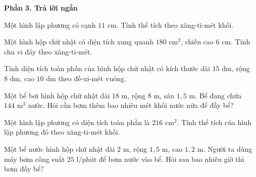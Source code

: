 \textbf{Phần 3. Trả lời ngắn}

\begin{ex} %
Một hình lập phương có cạnh $11\text{ cm}$. Tính thể tích theo xăng-ti-mét khối.
\end{ex}

\begin{ex} %
Một hình hộp chữ nhật có diện tích xung quanh $180\text{ cm}^2$, chiều cao $6\text{ cm}$. Tính chu vi đáy theo xăng-ti-mét.
\end{ex}

\begin{ex} %
Tính diện tích toàn phần của hình hộp chữ nhật có kích thước dài $15\text{ dm}$, rộng $8\text{ dm}$, cao $10\text{ dm}$ theo đề-xi-mét vuông.
\end{ex}

\begin{ex} %
Một bể bơi hình hộp chữ nhật dài $18\text{ m}$, rộng $8\text{ m}$, sâu $1{,}5\text{ m}$. Bể đang chứa $144\text{ m}^3$ nước. Hỏi cần bơm thêm bao nhiêu mét khối nước nữa để đầy bể?
\end{ex}

\begin{ex} %
Một hình lập phương có diện tích toàn phần là $216\text{ cm}^2$. Tính thể tích của hình lập phương đó theo xăng-ti-mét khối.
\end{ex}

\begin{ex} %
Một bể nước hình hộp chữ nhật dài $2\text{ m}$, rộng $1{,}5\text{ m}$, cao $1{,}2\text{ m}$. Người ta dùng máy bơm công suất $25\text{ l/phút}$ để bơm nước vào bể. Hỏi sau bao nhiêu giờ thì bơm đầy bể?
\end{ex}
